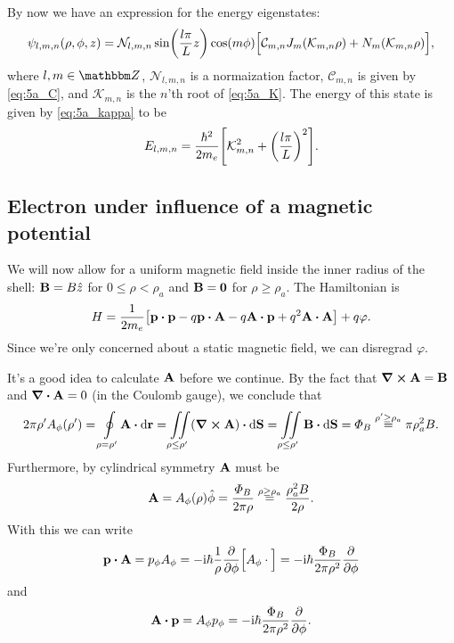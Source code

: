 \documentclass[11pt,letter, swedish, english
]{article}
\begin{document}
By now we have an expression for the energy eigenstates:
\begin{equation}
\psi_{l,m,n}(\rho, \phi, z)=
\mathcal{N}_{l,m,n}\sin(\frac{l\pi}{L}z)\cos(m\phi)
\Big[\mathcal{C}_{m,n}J_m\qty(\mathcal{K}_{m,n}\rho)+
N_m\qty(\mathcal{K}_{m,n}\rho) \Big],
\end{equation}
where $l, m\in\Z$, $\mathcal{N}_{l,m,n}$ is a normaization factor, 
$\mathcal{C}_{m,n}$ is given by \eqref{eq:5a_C}, and
$\mathcal{K}_{m,n}$ is the $n$'th root of \eqref{eq:5a_K}. 
The energy of this state is given by \eqref{eq:5a_kappa} to be
\begin{equation}
E_{l,m,n}=\frac{\hbar^2}{2m_e}\qty[\mathcal{K}_{m,n}^2 + \qty(\frac{l\pi}{L})^2].
\end{equation}




\subsection{Electron under influence of a magnetic potential}
We will now allow for a uniform magnetic field inside the inner radius of
the shell: $\vb{B}=B\hat{z}$ for $0\le\rho<\rho_a$ and $\vb{B}=\vb{0}$
for $\rho\ge\rho_a$. The Hamiltonian is 
\begin{equation}
H=\frac{1}{2m_e}\qty[\vb{p}\vdot\vb{p}
-q\vb{p}\vdot\vb{A}-q\vb{A}\vdot\vb{p}+q^2\vb{A}\vdot\vb{A}] 
+ q\varphi.
\end{equation}
Since we're only concerned about a static magnetic field, we can
disregrad $\varphi$.

It's a good idea to calculate $\vb{A}$ before we continue. By the
fact that $\curl{\vb{A}}=\vb{B}$ and
$\div\vb{A}=0$ (in the Coulomb gauge), we conclude that
\begin{equation}
2\pi\rho' A_\phi(\rho')=\oint\limits_{\rho=\rho'}\!\vb{A}\vdot\rd{\vb{r}}
=\iint\limits_{\rho\le\rho'}(\curl\vb{A})\vdot\rd\vb{S}
=\iint\limits_{\rho\le\rho'}\vb{B}\vdot\rd\vb{S}
=\varPhi_B\stackrel{\rho'\ge\rho_a}{=}\pi\rho_a^2B.
\end{equation}
Furthermore, by cylindrical symmetry $\vb{A}$ must be
\begin{equation}
\vb{A}=A_\phi(\rho)\hat\phi=\frac{\varPhi_B}{2\pi\rho}
\stackrel{\rho\ge\rho_a}{=}\frac{\rho_a^2B}{2\rho}.
\end{equation}
With this we can write
\begin{equation}
\vb{p}\vdot\vb{A}=p_\phi A_\phi 
= -\ii\hbar\frac{1}{\rho}\pdv{\phi}\Big[A_\phi\cdot\Big]
=-\ii\hbar\frac{\Phi_B}{2\pi\rho^2}\pdv{\phi}
\end{equation}
and
\begin{equation}
\vb{A}\vdot\vb{p}= A_\phi p_\phi
=-\ii\hbar\frac{\Phi_B}{2\pi\rho^2}\pdv{\phi}.
\end{equation}
\end{document}
